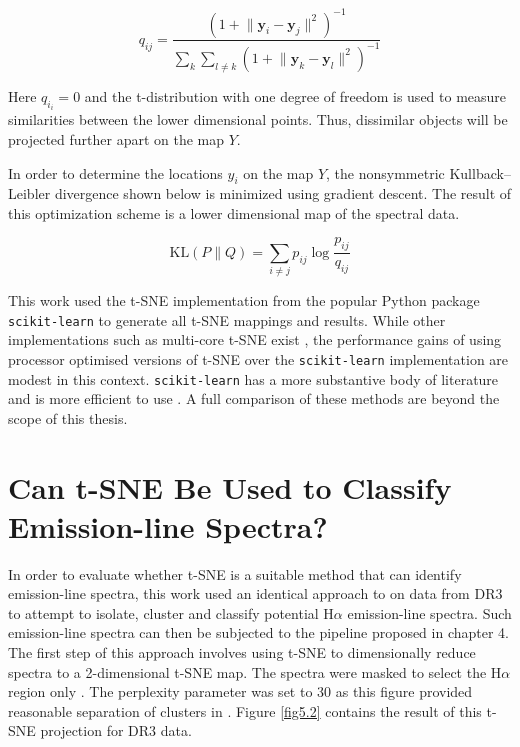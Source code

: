 \begin{equation}
    q_{ij}={\frac {(1+\lVert \mathbf {y} _{i}-\mathbf {y} _{j}\rVert ^{2})^{-1}}{\sum _{k}\sum _{l\neq k}(1+\lVert \mathbf {y} _{k}-\mathbf {y} _{l}\rVert ^{2})^{-1}}}
\end{equation}

Here $q_i_i=0$ and the t-distribution with one degree of freedom is used to measure similarities between the lower dimensional points. Thus, dissimilar objects will be projected further apart on the map $Y$.

In order to determine the locations $y_i$ on the map $Y$, the nonsymmetric Kullback–Leibler divergence shown below is minimized using gradient descent. The result of this optimization scheme is a lower dimensional map of the spectral data.

\begin{equation}
    \mathrm {KL} \left(P\parallel Q\right)=\sum _{i\neq j}p_{ij}\log {\frac {p_{ij}}{q_{ij}}}
\end{equation}

This work used the t-SNE implementation from the popular Python package \texttt{scikit-learn} to generate all t-SNE mappings and results. While other implementations such as multi-core t-SNE exist \citep{Ulyanov2016}, the performance gains of using processor optimised versions of t-SNE over the \texttt{scikit-learn} implementation are modest in this context. \texttt{scikit-learn} has a more substantive body of literature and is more efficient to use \citep{hackeling2017mastering}. A full comparison of these methods are beyond the scope of this thesis.

\section{Can t-SNE Be Used to Classify Emission-line Spectra?}

In order to evaluate whether t-SNE is a suitable method that can identify emission-line spectra, this work used an identical approach to \citet{traven2017galah} on data from DR3 to attempt to isolate, cluster and classify potential H$\alpha$ emission-line spectra. Such emission-line spectra can then be subjected to the pipeline proposed in chapter 4. The first step of this approach involves using t-SNE to dimensionally reduce spectra to a 2-dimensional t-SNE map. The spectra were masked to select the H$\alpha$ region only \citep{traven2017galah}. The perplexity parameter was set to 30 as this figure provided reasonable separation of clusters in \citet{traven2017galah}. Figure \ref{fig5.2} contains the result of this t-SNE projection for DR3 data. 


